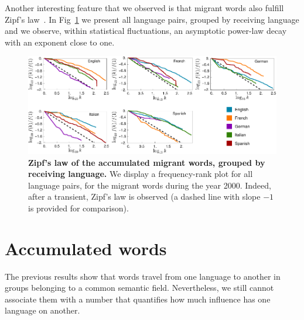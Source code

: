 \documentclass[10pt,letterpaper]{article} %
\begin{document}
Another interesting feature that we observed is that migrant words also 
fulfill Zipf's law~\cite{Zipf}. In Fig~\ref{fig.ZL_receiving} we present all language pairs, 
grouped by receiving language and we observe, 
within statistical fluctuations, an asymptotic power-law decay with an exponent
close to one. %


\begin{figure}[!h]
	\begin{adjustwidth}{-2cm}{1cm}
		\centering
		\includegraphics{images/zipfFinal.pdf}
		\caption{{\bf Zipf's law of the accumulated migrant words,
grouped by receiving language.} We display a frequency-rank 
plot for all language pairs, for the migrant words during the year 2000.
Indeed, after a transient, Zipf's law is observed (a dashed line with slope $-1$ is
provided for comparison). }
		\label{fig.ZL_receiving}
	\end{adjustwidth}
\end{figure}

\section*{Accumulated words} %

The previous results show that words travel from one language to another in
groups belonging to a common semantic field. Nevertheless, we still cannot
associate them with a number that quantifies how much influence has one
language on another.
\end{document}
